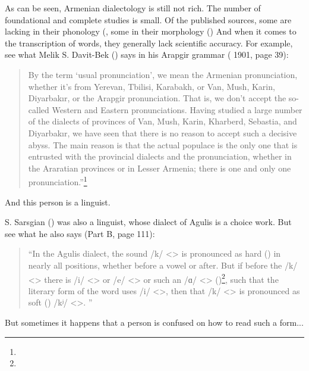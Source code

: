 As can be seen, Armenian dialectology is still not rich. The number of foundational and complete studies is small. Of the published sources, some are lacking in their phonology (, some in their morphology () And when it comes to the transcription of words, they generally lack scientific accuracy. For example, see what Melik S. Davit-Bek () says in his Arapgir grammar ( 1901, page 39): 

\begin{quote}
	By the term `usual pronunciation', we mean the Armenian pronunciation, whether it's from Yerevan, Tbilisi, Karabakh, or Van, Mush, Karin, Diyarbakır, or the Arapgir pronunciation. That is, we don't accept the so-called Western and Eastern pronunciations. Having studied a large number of the dialects of provinces of Van, Mush, Karin, Kharberd, Sebastia, and Diyarbakır, we have seen that there is no reason to accept such a decisive abyss. The main reason is that the actual populace is the only one that is entrusted with the provincial dialects and the pronunciation, whether in the Araratian provinces or in Lesser Armenia; there is one and only one pronunciation.''\footnote{}
\end{quote}


And this person is a linguist.

S. Sarsgian () was also a linguist, whose dialect of Agulis is a choice work. But see what he also says (Part B, page 111):

\begin{quote}
	``In the Agulis dialect, the sound /k/ <> is pronounced as hard () in nearly all positions, whether before a vowel or after. But if before the /k/ <> there is /i/ <> or /e/ <> or such an /ɑ/ <> ()\footnote{}, such that the literary form of the word uses /i/ <>, then that /k/ <> is pronounced as soft () /kʲ/ <>. '' 
\end{quote}


But sometimes it happens that a person is confused on how to read such a form... 

\begin{adjarianpage}\label{page:5}\end{adjarianpage}%

